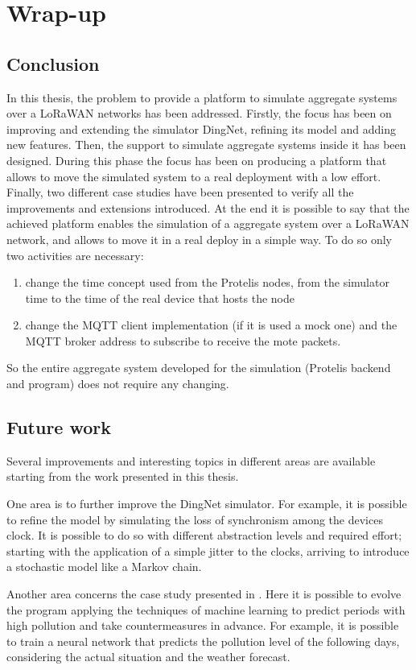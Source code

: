 \chapter{Wrap-up}
\label{chap:conclusions}
\section{Conclusion} 
In this thesis, the problem to provide a platform to simulate aggregate systems over a LoRaWAN networks has been addressed.
Firstly, the focus has been on improving and extending the simulator DingNet, refining its model and adding new features.
Then, the support to simulate aggregate systems inside it has been designed. 
During this phase the focus has been on producing a platform that allows to move the simulated system to a real deployment with a low effort.
Finally, two different case studies have been presented to verify all the improvements and extensions introduced.
At the end it is possible to say that the achieved platform enables the simulation of a aggregate system over a LoRaWAN network, and allows to move it in a real deploy in a simple way. 
To do so only two activities are necessary:
\begin{enumerate}
    \item change the time concept used from the Protelis nodes, from the simulator time to the time of the real device that hosts the node
    \item change the MQTT client implementation (if it is used a mock one) and the MQTT broker address to subscribe to receive the mote packets.
\end{enumerate}
 So the entire aggregate system developed for the simulation (Protelis backend and program) does not require any changing.

\section{Future work}
Several improvements and interesting topics in different areas are available starting from the work presented in this thesis.

One area is to further improve the DingNet simulator. 
For example, it is possible to refine the model by simulating the loss of synchronism among the devices clock. 
It is possible to do so with different abstraction levels and required effort; starting with the application of a simple jitter to the clocks, arriving to introduce a stochastic model like a Markov chain.

Another area concerns the case study presented in . 
Here it is possible to evolve the program applying the techniques of machine learning to predict periods with high pollution and take countermeasures in advance. 
For example, it is possible to train a neural network that predicts the pollution level of the following days, considering the actual situation and the weather forecast.

